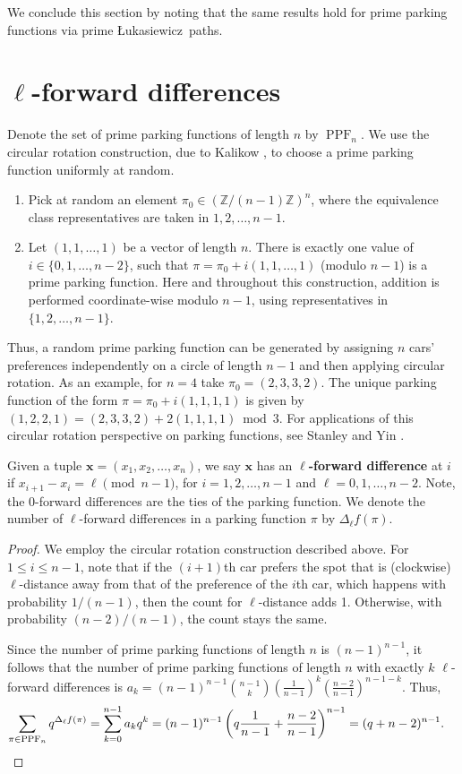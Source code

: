 \documentclass[12pt,reqno]{amsart}
\theoremstyle{definition}
\theoremstyle{remark}
\newcommand{\x}{\textbf{x}}
\newcommand{\fd}{\Delta_{\ell} f}
\DeclareMathOperator{\PPF}{PPF}
\newcommand{\Luka}{\L ukasiewicz}
\begin{document}
We conclude this section by noting that the same results hold for prime parking functions via prime \Luka~paths.


\section{$\ell$-forward differences} \label{sec:l-forward diff}
Denote the set of prime parking functions of length $n$ by $\PPF_n$. We use the circular rotation construction, due to Kalikow \cite[pp.~141-142]{Stanley}, to choose a prime parking function uniformly at random.

\begin{enumerate}
\item Pick at random an element $\pi_0 \in (\mathbb{Z}/(n-1)\mathbb{Z})^n$, where the equivalence class representatives are taken in $1,2, \dots, n-1$.
\item Let $(1,1, \dots,
  1)$ be a vector of length $n$.  There is exactly one value of $i \in \{0,1, \dots, n-2\}$, such that $\pi=\pi_0+i(1,1, \dots,
  1)$ (modulo $n-1$) is a prime parking function. Here and throughout this construction, addition is performed coordinate-wise modulo $n-1$, using representatives in $\{1,2,\ldots,n-1\}$.
\end{enumerate}
Thus, a random prime parking function can be generated by assigning $n$ cars' preferences independently on a
circle of length $n-1$ and then applying circular rotation.  As an example, for $n=4$ take $\pi_0=(2,3,3,2).$  The unique parking function of the form $\pi=\pi_0+i(1,1,1,1)$ is given by $(1,2,2,1)=(2,3,3,2)+2(1,1,1,1) \bmod{3}.$ For applications of this circular rotation perspective on parking functions, see Stanley and Yin \cite{StanleyYin}.


Given a tuple $\x=(x_1,x_2,\ldots,x_n)$, we say $\x$ has an {\bf $\ell$-forward difference} at $i$ if $x_{i+1}-x_{i}=\ell\pmod{n-1}$, for $i=1,2,\ldots, n-1$ and $\ell=0,1,\ldots, n-2$.  
Note, the $0$-forward differences are the ties of the parking function.  
We denote the number of $\ell$-forward differences in a parking function $\pi$ by $\fd(\pi).$ 

\PPFRotationCount*

\begin{proof}
We employ the circular rotation construction described above. For $1\leq i\leq n-1$, note that if the
$(i+1)$th car prefers the spot that is (clockwise) $\ell$-distance away from that of the preference of the $i$th car, which happens with probability $1/(n-1)$, then the count for $\ell$-distance adds 1. Otherwise, with probability $(n-2)/(n-1)$, the count stays the same.

Since the number of prime parking functions of length $n$ is
$(n-1)^{n-1}$, it follows that the number of prime parking functions of length $n$ with exactly $k$ $\ell$-forward differences is $a_k=(n-1)^{n-1}\binom{n-1}{k}\left(\frac{1}{n-1}\right)^k\left(\frac{n-2}{n-1}\right)^{n-1-k}.$  Thus, 
\begin{align*}
\sum_{\pi \in \PPF_n} q^{\fd(\pi)}&=\sum_{k=0}^{n-1}a_kq^k=(n-1)^{n-1} \left(q\frac{1}{n-1}+\frac{n-2}{n-1}\right)^{n-1} 
=(q+n-2)^{n-1}.\qedhere
\end{align*}
\end{proof}
\end{document}
